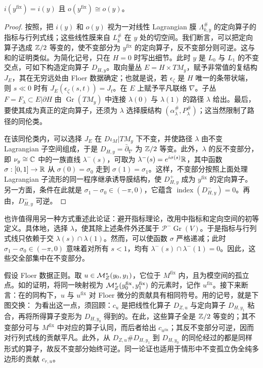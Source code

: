 \begin{lemma}\label{st:14.9}
$i(y^{\mathrm{fix}})=i(y)$ 且 $o(y^{\mathrm{fix}})\cong o(y)$。
\end{lemma}
\begin{proof}
按照，把 $i(y)$ 和 $o(y)$ 视为一对线性 Lagrangian 膜 $\Lambda_{k,y}^\#$ 的定向算子的指标与行列式线；这些线性膜来自 $L_k^\#$ 在 $y$ 处的切空间。我们断言，可以把定向算子选成 $\mathbb Z/2$ 等变的，使不变部分为 $y^{\mathrm{fix}}$ 的定向算子，反不变部分则可逆。这与和的证明类似。为简化记号，只在 $H=0$ 时写出细节。此时 $y$ 是 $L_0$ 与 $L_1$ 的不变交点，可如下构造定向算子 $D_{H,y}$。取向量丛 $E=H\times TM_y$，赋予非常值的复结构 $J_E$，其在无穷远处由 Floer 数据确定；也就是说，若 $\epsilon_\zeta$ 是 $H$ 唯一的条带状端，则 $s\ll0$ 时有 $J_E(\epsilon_\zeta(s,t))=J_t$。在 $E$ 上赋予平凡联络 $\nabla$。子丛 $F=F_\lambda\subset E|\partial H$ 由 $\operatorname{Gr}(TM_y)$ 中连接 $\lambda(0)$ 与 $\lambda(1)$ 的路径 $\lambda$ 给出。最后，要使其成为真正的定向算子，还须为 $\lambda$ 选择膜结构 $(\alpha_\lambda^\#,P_\lambda^\#)$；这当然限制了路径的同伦类。

在该同伦类内，可以选择 $J_E$ 在 $D\iota_M|TM_y$ 下不变，并使路径 $\lambda$ 由不变 Lagrangian 子空间组成，于是 $D_{H,y}=\bar\partial_\nabla$ 为 $\mathbb Z/2$ 等变。此外，$\lambda$ 的反不变部分，即 $\nu_y\cong\mathbb C$ 中的一族直线 $\lambda^-(s)$，可取为 $\lambda^-(s)=e^{i\sigma(s)}\mathbb R$，其中函数 $\sigma:[0,1]\to\mathbb R$ 从 $\sigma(0)=\sigma_0$ 走到 $\sigma(1)=\sigma_1$。这样，不变部分按照上面处理 Lagrangian 子流形的同一程序继承诱导膜结构，使 $D^+_{H,y}$ 成为 $y^{\mathrm{fix}}$ 的定向算子。另一方面，条件在此就是 $\sigma_1-\sigma_0\in(-\pi,0)$，它蕴含 $\operatorname{index}(D^-_{H,y})=0$。再由，$D^-_{H,y}$ 可逆。
\end{proof}

\begin{note}\label{st:14.10}
也许值得用另一种方式重述此论证：避开指标理论，改用中指标和定向空间的初等定义。具体地，选择 $\lambda$，使其除上述条件外还属于 $\mathcal P^-\operatorname{Gr}(V)$。于是指标与行列式线只依赖于交 $\lambda(s)\cap\lambda(1)$。然而，可以使函数 $\sigma$ 严格递减；此时 $\sigma_1-\sigma_0\in(-\pi,0)$ 意味着对所有 $s<1$，均有 $\lambda^-(s)\cap\lambda^-(1)=0$。因此，这些交全部集中在不变部分。
\end{note}

假设 Floer 数据正则。取 $u\in\mathcal M_Z^*(y_0,y_1)$，它位于 $M^{\mathrm{fix}}$ 内，且为模空间的孤立点。如的证明，将同一映射视为 $\mathcal M_Z^*(y_0^{\mathrm{fix}},y_1^{\mathrm{fix}})$ 的元素时，记作 $u^{\mathrm{fix}}$。接下来断言：在的同构下，$u$ 与 $u^{\mathrm{fix}}$ 对 Floer 微分的贡献具有相同符号。用的记号，就是下图交换：
为看出这一点，须回顾：$c_u$ 是把线性化算子 $D_{Z,u}$ 与定向算子 $D_{H,y_1}$ 粘合，再将所得算子变形为 $D_{H,y_0}$ 得到的。在此，这些算子全是 $\mathbb Z/2$ 等变的；其不变部分可与 $M^{\mathrm{fix}}$ 中对应的算子认同，而后者给出 $c_{u^{\mathrm{fix}}}$；其反不变部分可逆，因而对行列式线的贡献平凡。此外，从 $D_{Z,u}\#D_{H,y_1}$ 到 $D_{H,y_0}$ 的同伦经过的都是同样形式的算子，故反不变部分始终可逆。同一论证也适用于情形中不变孤立伪全纯多边形的贡献 $c_{r,u}$。
